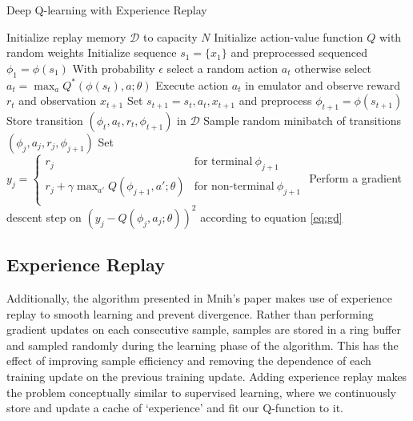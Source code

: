 \documentclass{article}
\begin{document}
\begin{algorithm}
\caption{Deep Q-learning with Experience Replay}
\label{alg:dqn}
\begin{algorithmic}[1]
\State Initialize replay memory $\mathcal{D}$ to capacity $N$
\State Initialize action-value function $Q$ with random weights
    \State Initialize sequence $s_1 = \{x_1\}$ and preprocessed sequenced $\phi_1 = \phi(s_1)$
        \State With probability $\epsilon$ select a random action $a_t$
        \State otherwise select $a_t = \max_{a}Q^{*}(\phi(s_t), a; \theta)$
        \State Execute action $a_t$ in emulator and observe reward $r_t$ and observation $x_{t + 1}$
        \State Set $s_{t + 1} = s_t, a_t, x_{t + 1}$ and preprocess $\phi_{t + 1} = \phi(s_{t + 1})$
        \State Store transition $(\phi_t, a_t, r_t, \phi_{t + 1})$ in $\mathcal{D}$
        \State Sample random minibatch of transitions $(\phi_j, a_j, r_j, \phi_{j + 1})$
        \State Set $ \displaystyle  y_j = 
                        \begin{cases}
                            r_j & \textrm{for terminal}\ \phi_{j + 1} \\
                            r_j + \gamma\max_{a'}Q(\phi_{j + 1}, a'; \theta) & \textrm{for non-terminal}\ \phi_{j + 1} \\
                        \end{cases}
                   $
        \State Perform a gradient descent step on $(y_j - Q(\phi_j, a_j; \theta))^2$ according to equation \ref{eq:gd}
    \EndFor
\EndFor
\end{algorithmic}
\end{algorithm}

\subsection{Experience Replay}
Additionally, the algorithm presented in Mnih's paper makes use of experience replay to smooth learning and prevent divergence.
Rather than performing gradient updates on each consecutive sample, samples are stored in a ring buffer and sampled randomly during the learning phase of the algorithm. 
This has the effect of improving sample efficiency and removing the dependence of each training update on the previous training update.
Adding experience replay makes the problem conceptually similar to supervised learning, where we continuously store and update a cache of `experience' and fit our Q-function to it.
\end{document}
